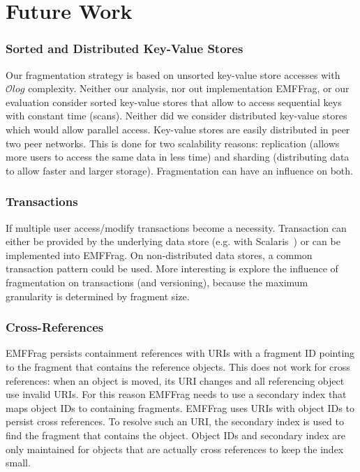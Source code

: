 \section{Future Work} 

\subsubsection{Sorted and Distributed Key-Value Stores} 

Our fragmentation strategy is based on unsorted key-value store accesses with $\mathcal{O}log$ complexity. Neither our analysis, nor out implementation EMFFrag, or our evaluation consider sorted key-value stores that allow to access sequential keys with constant time (scans). Neither did we consider distributed key-value stores which would allow parallel access. Key-value stores are easily distributed in peer two peer networks. This is done for two scalability reasons: replication (allows more users to access the same data in less time) and sharding (distributing data to allow faster and larger storage). Fragmentation can have an influence on both.

\subsubsection{Transactions}

If multiple user access/modify transactions become a necessity. Transaction can either be provided by the underlying data store (e.g. with Scalaris~\cite{ScalarisTransactions2008}) or can be implemented into EMFFrag. On non-distributed data stores, a common transaction pattern could be used. More interesting is explore the influence of fragmentation on transactions (and versioning), because the maximum granularity is determined by fragment size.

\subsubsection{Cross-References} 

EMFFrag persists containment references with URIs with a fragment ID pointing to the fragment that contains the reference objects. This does not work for cross references: when an object is moved, its URI changes and all referencing object use invalid URIs. For this reason EMFFrag needs to use a secondary index that maps object IDs to containing fragments. EMFFrag uses URIs with object IDs to persist cross references. To resolve such an URI, the secondary index is used to find the fragment that contains the object. Object IDs and secondary index are only maintained for objects that are actually cross references to keep the index small. 

